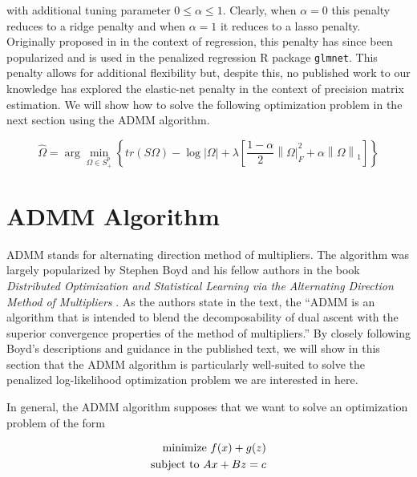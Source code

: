 \documentclass[11pt,]{report}
\theoremstyle{definition}
\theoremstyle{definition}
\theoremstyle{definition}
\theoremstyle{remark}
\begin{document}
with additional tuning parameter \(0 \leq \alpha \leq 1\). Clearly, when \(\alpha = 0\) this penalty reduces to a ridge penalty and when \(\alpha = 1\) it reduces to a lasso penalty. Originally proposed in \citet{zou2005regularization} in the context of regression, this penalty has since been popularized and is used in the penalized regression R package \texttt{glmnet}. This penalty allows for additional flexibility but, despite this, no published work to our knowledge has explored the elastic-net penalty in the context of precision matrix estimation. We will show how to solve the following optimization problem in the next section using the ADMM algorithm.

\begin{equation}
\hat{\Omega} = \arg\min_{\Omega \in S_{+}^{p}}\left\{ tr\left(S\Omega\right) - \log\left|\Omega \right| + \lambda\left[\frac{1 - \alpha}{2}\left\| \Omega \right|_{F}^{2} + \alpha\left\| \Omega \right\|_{1} \right] \right\}
\label{eq:optimelastic}
\end{equation}

\hypertarget{admm-algorithm}{%
\section{ADMM Algorithm}\label{admm-algorithm}}

ADMM stands for alternating direction method of multipliers. The algorithm was largely popularized by Stephen Boyd and his fellow authors in the book \emph{Distributed Optimization and Statistical Learning via the Alternating Direction Method of Multipliers} \citep{boyd2011distributed}. As the authors state in the text, the ``ADMM is an algorithm that is intended to blend the decomposability of dual ascent with the superior convergence properties of the method of multipliers.'' By closely following Boyd's descriptions and guidance in the published text, we will show in this section that the ADMM algorithm is particularly well-suited to solve the penalized log-likelihood optimization problem we are interested in here.

In general, the ADMM algorithm supposes that we want to solve an optimization problem of the form

\begin{equation}
\begin{split}
  \mbox{minimize } f(x) + g(z) \\
  \mbox{subject to } Ax + Bz = c
\end{split}
\label{eq:boyd}\notag
\end{equation}
\end{document}
